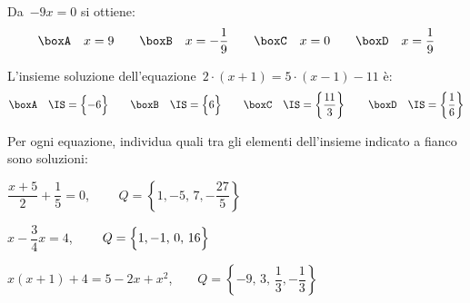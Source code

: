 \begin{esercizio}
\label{ese:13.48}
Da~$-9x=0$ si ottiene:
\[\boxA\quad x=9\qquad\boxB\quad x=-{\dfrac{1}{9}}\qquad\boxC\quad 
x=0\qquad\boxD\quad x=\dfrac{1}{9}\]
\end{esercizio}

\begin{esercizio}
\label{ese:13.49}
L'insieme soluzione dell'equazione~$2\cdot \left(x+1\right)=5\cdot 
\left(x-1\right)-11$ è:
\[\boxA\quad \IS=\Bigl\{-6\Bigr\}\qquad\boxB\quad 
\IS=\Bigl\{6\Bigr\}\qquad\boxC\quad 
\IS=\left\{\dfrac{11}{3}\right\}\qquad\boxD\quad 
\IS=\left\{\dfrac{1}{6}\right\}\]
\end{esercizio}

\begin{esercizio}
\label{ese:13.50}
Per ogni equazione, individua quali tra gli elementi dell'insieme indicato a 
fianco sono soluzioni:
\begin{enumeratea}
\spazielenx
 \item $\dfrac{x+5}{2}+\dfrac{1}{5}=0$, $\qquad 
Q=\left\{1,-5,\,7,-\dfrac{27}{5}\right\}$
 \item $x-\dfrac{3}{4}x=4$, $\qquad Q=\Bigl\{1,-1,\,0,\,16\Bigr\}$
 \item $x(x+1)+4=5-2x+x^{2}$,$\qquad 
Q=\left\{-9,\,3,\,\dfrac{1}{3},-\dfrac{1}{3}\right\}$
\end{enumeratea}
\end{esercizio}
